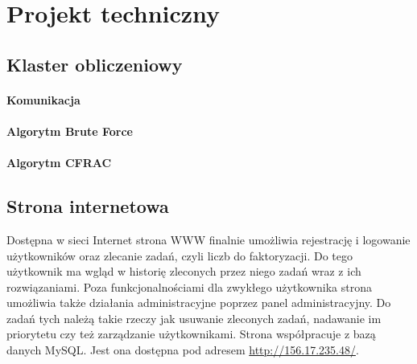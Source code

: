 \documentclass{article}
\begin{document}




\section{Projekt techniczny}

\subsection{Klaster obliczeniowy}

\paragraph{Komunikacja}

\paragraph{Algorytm Brute Force}

\paragraph{Algorytm CFRAC}

\subsection{Strona internetowa}

Dostępna w sieci Internet strona WWW finalnie umożliwia rejestrację i logowanie użytkowników oraz zlecanie zadań, czyli liczb do faktoryzacji. Do tego użytkownik ma wgląd w historię zleconych przez niego zadań wraz z ich rozwiązaniami. Poza funkcjonalnościami dla zwykłego użytkownika strona umożliwia także działania administracyjne poprzez panel administracyjny. Do zadań tych należą takie rzeczy jak usuwanie zleconych zadań, nadawanie im priorytetu czy też zarządzanie użytkownikami. Strona współpracuje z bazą danych MySQL. Jest ona dostępna pod adresem \url{http://156.17.235.48/}.
\end{document}
